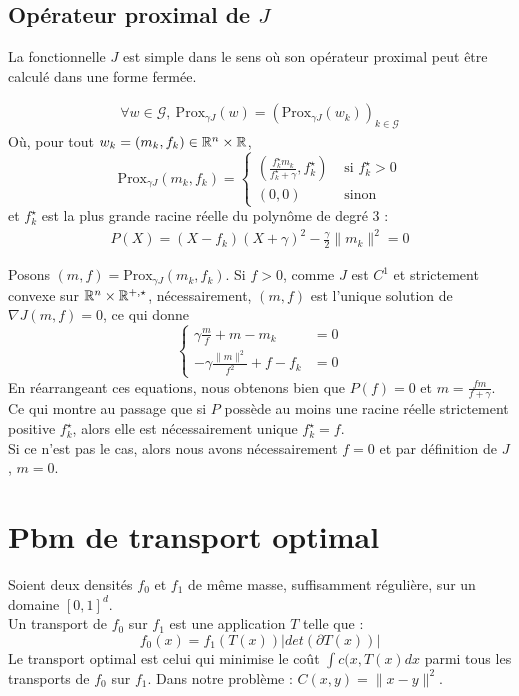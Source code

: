 \documentclass[a4paper,12pt]{article}
\newcommand{\prox}{\text{Prox}}
\begin{document}
\subsection{Opérateur proximal de $J$}
La fonctionnelle $J$ est simple dans le sens où son opérateur proximal peut être calculé dans une forme fermée. 
\begin{proposition}
\begin{align*}
\forall w\in\mathcal{G},\ \prox_{\gamma J}(w) = \left( \prox_{\gamma J}(w_k)\right)_{k\in\mathcal{G}}
\end{align*}
Où, pour tout $w_k=(m_k,f_k)\in\mathbb{R}^n\times\mathbb{R}$, 
$$
\prox_{\gamma J}(m_k,f_k) =\left\{
\begin{array}{cl}
\left(\frac{f^{\star}_k m_k}{f^{\star}_k+\gamma} ,f^{\star}_k\right) & \text{ si } f^{\star}_k >0\\
(0,0) & \text{ sinon }
\end{array}\right.
$$
et $f^{\star}_k$ est la plus grande racine réelle du polynôme de degré 3 : 
\begin{align}
P(X) = (X-f_k)(X+\gamma)^2 -\frac{\gamma}{2}\|m_k\|^2=0
\end{align}
\end{proposition}
\begin{preuve}
Posons $(m,f)=\prox_{\gamma J}(m_k,f_k)$. Si $f>0$, comme $J$ est $C^1$ et strictement convexe sur $\mathbb{R}^n\times\mathbb{R}^{+,\star}$, nécessairement, $(m,f)$ est l'unique solution de $\nabla J(m,f)=0$, ce qui donne 
$$
\left\{
\begin{array}{cc}
\gamma \frac{m}{f}+m-m_k &= 0\\
-\gamma \frac{\|m\|^2}{f^2} + f-f_k &= 0
\end{array}
\right.
$$
En réarrangeant ces equations, nous obtenons bien que $P(f) = 0$ et $m=\frac{f m}{f+\gamma}$. Ce qui montre au passage que si $P$ possède au moins une racine réelle strictement positive $f^{\star}_k$, alors elle est nécessairement unique $f^{\star}_k =f $. \\
Si ce n'est pas le cas, alors nous avons nécessairement $f= 0$ et par définition de $J$, $m=0$.
\end{preuve}
\newpage

\section{Pbm de transport optimal}
Soient deux densités $f_0$ et $f_1$ de même masse, suffisamment régulière, sur un domaine $[0,1]^d$.\\
Un transport de $f_0$ sur $f_1$ est une application $T$ telle que :
$$
f_0(x)=f_1(T(x))|det(\partial T(x))|
$$
Le transport optimal est celui qui minimise le coût $\int c(x,T(x)dx$ parmi tous les transports de $f_0$ sur $f_1$. Dans notre problème : $C(x,y) =\|x-y\|^2$. 
\end{document}
